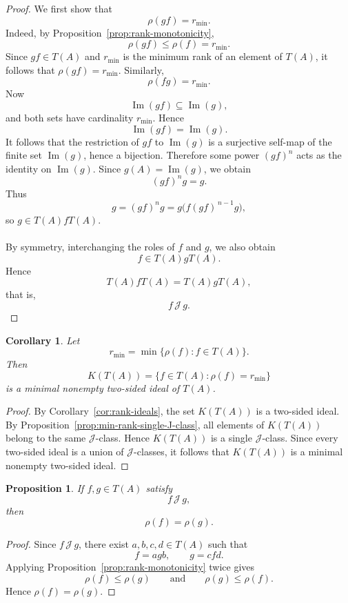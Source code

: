 \documentclass[11pt]{article}
\newtheorem{corollary}[theorem]{Corollary}
\newtheorem{proposition}[theorem]{Proposition}
\begin{document}
\begin{proof}
We first show that
\[
\rho(gf)=r_{\min}.
\]
Indeed, by Proposition~\ref{prop:rank-monotonicity},
\[
\rho(gf)\leq \rho(f)=r_{\min}.
\]
Since \(gf\in T(A)\) and \(r_{\min}\) is the minimum rank of an element of \(T(A)\), 
it follows that \(\rho(gf)=r_{\min}\). Similarly,
\[
\rho(fg)=r_{\min}.
\]
Now
\[
\operatorname{Im}(gf)\subseteq \operatorname{Im}(g),
\]
and both sets have cardinality \(r_{\min}\). Hence
\[
\operatorname{Im}(gf)=\operatorname{Im}(g).
\]
It follows that the restriction of \(gf\) to \(\operatorname{Im}(g)\) is a
surjective self-map of the finite set \(\operatorname{Im}(g)\), hence a
bijection. Therefore some power \((gf)^n\) acts as the identity on \(\operatorname{Im}(g)\).
Since \(g(A)=\operatorname{Im}(g)\), we obtain
\[
(gf)^n g = g.
\]
Thus
\[
g=(gf)^n g = g\bigl(f(gf)^{\,n-1}g\bigr),
\]
so \(g\in T(A)fT(A)\).\\\\
By symmetry, interchanging the roles of \(f\) and \(g\), we also obtain
\[
f\in T(A)gT(A).
\]
Hence
\[
T(A)fT(A)=T(A)gT(A),
\]
that is,
\[
f\,\mathcal J\, g.
\]
\end{proof}


\begin{corollary}\label{cor:minimal-ideal}
Let
\[
r_{\min}=\min\{\rho(f):f\in T(A)\}.
\]
Then
\[
K(T(A))=\{f\in T(A):\rho(f)=r_{\min}\}
\]
is a minimal nonempty two-sided ideal of \(T(A)\).
\end{corollary}

\begin{proof}
By Corollary~\ref{cor:rank-ideals}, the set \(K(T(A))\) is a two-sided ideal.
By Proposition~\ref{prop:min-rank-single-J-class}, all elements of \(K(T(A))\)
belong to the same \(\mathcal J\)-class. Hence \(K(T(A))\) is a single \(\mathcal J\)-class.
 Since every two-sided ideal is a union of \(\mathcal J\)-classes, it follows that \(K(T(A))\) is a minimal
nonempty two-sided ideal. 
\end{proof}

\begin{proposition}\label{prop:J-same-rank}
If \(f,g\in T(A)\) satisfy
\[
f\,\mathcal J\, g,
\]
then
\[
\rho(f)=\rho(g).
\]
\end{proposition}

\begin{proof}
Since \(f\,\mathcal J\, g\), there exist \(a,b,c,d\in T(A)\) such that
\[
f=agb,
\qquad
g=cfd.
\]
Applying Proposition~\ref{prop:rank-monotonicity} twice gives
\[
\rho(f)\leq \rho(g)
\qquad\text{and}\qquad
\rho(g)\leq \rho(f).
\]
Hence \(\rho(f)=\rho(g)\).
\end{proof}
\end{document}
